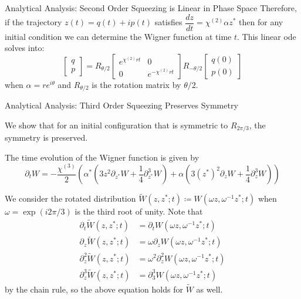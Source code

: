 \documentclass[final]{beamer}
\newcommand*{\wigner}{W(\omega z, \omega^{-1}z^{*};t)}
\newlength{\colwidth}
\begin{document}
\begin{frame}[t]
\begin{columns}[t]
\begin{column}{\colwidth}
\begin{block}{Analytical Analysis: Second Order Squeezing is Linear in Phase Space}
        Therefore, if the trajectory $z(t)=q(t)+ip(t)$ satisfies $\dfrac{dz}{dt}=\chi^{(2)}\alpha z^{*}$
        then for any initial condition we can determine the Wigner function at time $t$.
        This linear ode solves into:
        \[
          \begin{bmatrix}
            q \\
            p
          \end{bmatrix}
          =
          R_{\theta/2}
          \begin{bmatrix}
            e^{\chi^{(2)}rt} & 0                 \\
            0                & e^{-\chi^{(2)}rt}
          \end{bmatrix}
          R_{-\theta/2}
          \begin{bmatrix}
            q(0) \\
            p(0)
          \end{bmatrix}
        \]
        when $\alpha=re^{i\theta}$ and $R_{\theta/2}$ is the rotation matrix by $\theta/2$.

      \end{block}

      \begin{block}{Analytical Analysis: Third Order Squeezing Preserves Symmetry}

        We show that for an initial configuration that is symmetric to $R_{2\pi/3}$, the symmetry is preserved.

        The time evolution of the Wigner function is given by
        \[\partial_{t}W=-\frac{\chi^{(3)}}{2}\left(\alpha^{*}\left(3z^{2}\partial_{z^{*}}W+\frac{1}{4}\partial_{z^{*}}^{3}W\right)+\alpha\left(3(z^{*})^{2}\partial_{z}W+\frac{1}{4}\partial_{z}^{3}W\right)\right)\]

        We consider the rotated distribution $\tilde{W}(z,z^{*};t)\coloneq W(\omega z, \omega^{-1}z^{*};t)$ when $\omega=\exp(i2\pi/3)$ is the third root of unity.
        Note that
        \begin{align*}
          \partial_{t}\tilde{W}(z,z^{*};t)     & =\partial_{t}\wigner               \\
          \partial_{z}\tilde{W}(z,z^{*};t)     & =\omega\partial_{z}\wigner         \\
          \partial_{z}^{2}\tilde{W}(z,z^{*};t) & =\omega^{2}\partial_{z}^{2}\wigner \\
          \partial_{z}^{3}\tilde{W}(z,z^{*};t) & =\partial_{3}^{3}\wigner
        \end{align*}
        by the chain rule, so the above equation holds for $\tilde{W}$ as well.


\end{block}
\end{column}
\end{columns}
\end{frame}
\end{document}
